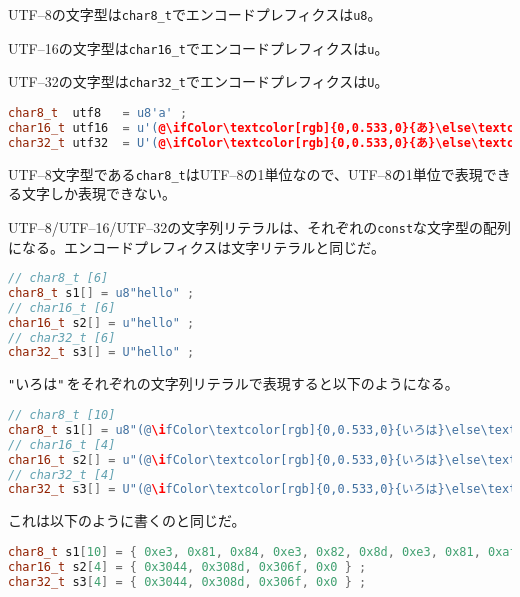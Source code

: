 UTF--8の文字型は\texttt{char8\_t}でエンコードプレフィクスは\texttt{u8}。

UTF--16の文字型は\texttt{char16\_t}でエンコードプレフィクスは\texttt{u}。

UTF--32の文字型は\texttt{char32\_t}でエンコードプレフィクスは\texttt{U}。

\begin{lstlisting}[language={C++}]
char8_t  utf8   = u8'a' ;
char16_t utf16  = u'(@\ifColor\textcolor[rgb]{0,0.533,0}{あ}\else\textcolor{black}{あ}\fi@)' ;
char32_t utf32  = U'(@\ifColor\textcolor[rgb]{0,0.533,0}{あ}\else\textcolor{black}{あ}\fi@)' ;
\end{lstlisting}

UTF--8文字型である\texttt{char8\_t}はUTF--8の1単位なので、UTF--8の1単位で表現できる文字しか表現できない。

UTF--8/UTF--16/UTF--32の文字列リテラルは、それぞれの\texttt{const}な文字型の配列になる。エンコードプレフィクスは文字リテラルと同じだ。

\begin{lstlisting}[language={C++}]
// char8_t [6]
char8_t s1[] = u8"hello" ;
// char16_t [6]
char16_t s2[] = u"hello" ;
// char32_t [6]
char32_t s3[] = U"hello" ;
\end{lstlisting}

\texttt{"}\textsf{いろは}\texttt{"}\,をそれぞれの文字列リテラルで表現すると以下のようになる。

\begin{lstlisting}[language={C++}]
// char8_t [10]
char8_t s1[] = u8"(@\ifColor\textcolor[rgb]{0,0.533,0}{いろは}\else\textcolor{black}{いろは}\fi@)" ;
// char16_t [4]
char16_t s2[] = u"(@\ifColor\textcolor[rgb]{0,0.533,0}{いろは}\else\textcolor{black}{いろは}\fi@)" ;
// char32_t [4]
char32_t s3[] = U"(@\ifColor\textcolor[rgb]{0,0.533,0}{いろは}\else\textcolor{black}{いろは}\fi@)" ;
\end{lstlisting}

これは以下のように書くのと同じだ。

\begin{lstlisting}[language={C++}]
char8_t s1[10] = { 0xe3, 0x81, 0x84, 0xe3, 0x82, 0x8d, 0xe3, 0x81, 0xaf, 0x0 } ;
char16_t s2[4] = { 0x3044, 0x308d, 0x306f, 0x0 } ;
char32_t s3[4] = { 0x3044, 0x308d, 0x306f, 0x0 } ;
\end{lstlisting}

